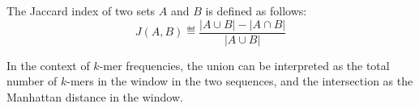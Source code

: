 The Jaccard index of two sets $A$ and $B$ is defined as follows:
\begin{equation}
  J(A, B) \eqdef \frac{|A \cup B| - |A \cap B|}{|A \cup B|}
\end{equation}

In the context of $k$-mer frequencies, the union can be interpreted as the
total number of $k$-mers in the window in the two sequences, and the
intersection as the Manhattan distance in the window.

